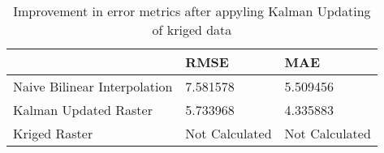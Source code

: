 \begin{table}
\caption{Improvement in error metrics after appyling Kalman Updating of kriged data}
\label{tab:charlotteamalie_lidar_error}
\begin{tabular}{lll}
\toprule
 & RMSE & MAE \\
\midrule
Naive Bilinear Interpolation & 7.581578 & 5.509456 \\
Kalman Updated Raster & 5.733968 & 4.335883 \\
Kriged Raster & Not Calculated & Not Calculated \\
\bottomrule
\end{tabular}
\end{table}
